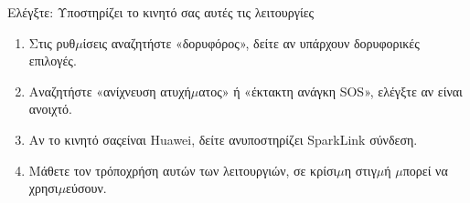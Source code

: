 \begin{tcbpractice}{Ελέγξτε: Υποστηρίζει το κινητό σας αυτές τις λειτουργίες}
\begin{enumerate}
  \item Στις ρυθ$\mu$ίσεις αναζητήστε «δορυφόρος», δείτε αν υπάρχουν δορυφορικές επιλογές.
  \item Αναζητήστε «ανίχνευση ατυχή$\mu$ατος» ή «έκτακτη ανάγκη SOS», ελέγξτε αν είναι ανοιχτό.
  \item Αν το κινητό σαςείναι Huawei, δείτε ανυποστηρίζει SparkLink σύνδεση.
  \item Μάθετε τον τρόποχρήση αυτών των λειτουργιών, σε κρίσι$\mu$η στιγ$\mu$ή $\mu$πορεί να χρησι$\mu$εύσουν.
\end{enumerate}

\end{tcbpractice}

